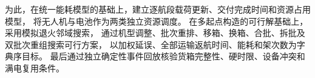 为此，在统一能耗模型的基础上，建立逐航段载荷更新、交付完成时间和资源占用模型，
将无人机与电池作为两类独立资源调度。
在多起点构造的可行解基础上，采用模拟退火邻域搜索，
通过机型调整、批次重排、移箱、换箱、合批、拆批及双批次重组搜索可行方案，
以加权延误、全部运输返航时间、能耗和架次数为字典序目标。
最后通过独立确定性事件回放核验货箱完整性、硬时限、设备冲突和满电复用条件。
